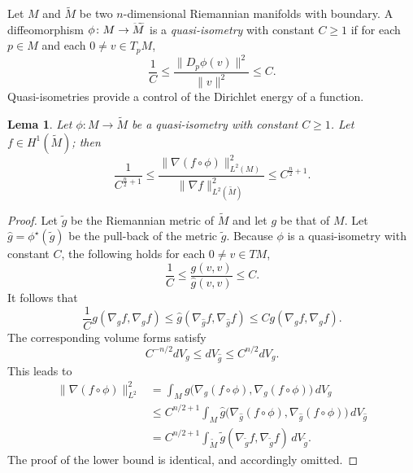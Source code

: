 \documentclass{GEM-JNL-FMP}
\newtheorem{lemma}[theorem]{Lema}
\theoremstyle{definition}
\numberwithin{equation}{section}
\begin{document}
Let $M$ and $\widetilde{M}$ be two $n$-dimensional Riemannian manifolds with boundary. A diffeomorphism $\phi\colon M\rightarrow\smash{\widetilde{M}}$ is a \emph{quasi-isometry} with constant $C\geq 1$ if for each $p\in M$ and each $0\neq v\in T_pM$,
$$\frac{1}{C}\leq\frac{\|D_p\phi(v)\|^2}{\|v\|^2}\leq C.$$
Quasi-isometries provide a control of the Dirichlet energy of a function.
\begin{lemma}\label{lemma:QIcontrolEnergy}
Let $\phi\colon M\rightarrow\widetilde{M}$ be a quasi-isometry with constant $C\geq 1$. Let $f\in H^1(\widetilde{M})$; then
$$\frac{1}{C^{\frac{n}{2}+1}}\leq\frac{\|\nabla (f\circ\phi)\|_{L^2(M)}^2}{\|\nabla f\|_{L^2(\widetilde{M})}^2}\leq C^{\frac{n}{2}+1}.$$
\end{lemma}
\begin{proof}
Let $\widetilde{g}$ be the Riemannian metric of $\widetilde{M}$ and let $g$ be that of $M$. Let $\widehat{g}=\phi^\star(\widetilde{g})$ be the pull-back of the metric $\widetilde{g}$. Because $\phi$ is a quasi-isometry with constant $C$, the following holds for each $0\neq v\in TM$,
$$\frac{1}{C}\leq \frac{g(v,v)}{\widehat{g}(v,v)}\leq C.$$
It follows that
$$\frac{1}{C}g(\nabla_{g}f,\nabla_{g}f)\leq\widehat{g}(\nabla_{\widehat{g}}f,\nabla_{\widehat{g}}f)\leq Cg(\nabla_{g}f,\nabla_{g}f).$$
The corresponding volume forms satisfy
$$C^{-n/2}dV_g\leq dV_{\widehat{g}}\leq C^{n/2}dV_g.$$
This leads to
\begin{align*}
\|\nabla (f\circ\phi)\|_{L^2}^2&=\int_M g\bigl(\nabla_g (f\circ\phi),\nabla_g(f\circ\phi)\bigr)\,dV_g\\
&\leq
C^{n/2+1}\int_M {\widehat{g}}\bigl(\nabla_{\widehat{g}} (f\circ\phi),\nabla_{\widehat{g}} (f\circ\phi)\bigr)\,dV_{\widehat{g}}\\
&=
C^{n/2+1}\int_{\widetilde{M}} {\widetilde{g}}(\nabla_{\widetilde{g}} f,\nabla_{\widetilde{g}} f)\,dV_{\widetilde{g}}.
\end{align*}
The proof of the lower bound is identical, and accordingly omitted.
\end{proof}
\end{document}
